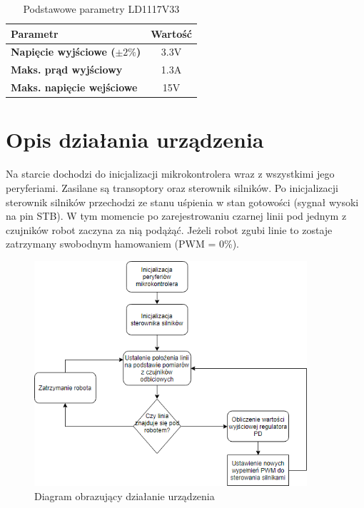 \documentclass[10pt, a4paper]{article}
\begin{document}
\begin{table}[H]
	\centering
	\begin{tabular}{|l|c|} \hline
		\textbf{Parametr} & Wartość \\
		\hline
		\hline  \textbf{Napięcie wyjściowe ($\pm 2\%$)}& 3.3V\\\hline
		\textbf{Maks. prąd wyjściowy} & 1.3A\\
		\hline
		\textbf{Maks. napięcie wejściowe} & 15V\\
		\hline
	\end{tabular}
	\caption{Podstawowe parametry LD1117V33}
	\label{tab:LD1117V33}
\end{table}
\newpage
\section{Opis działania urządzenia}
	Na starcie dochodzi do inicjalizacji mikrokontrolera wraz z wszystkimi jego peryferiami. Zasilane są transoptory oraz sterownik silników. Po inicjalizacji sterownik silników przechodzi ze stanu uśpienia w stan gotowości (sygnał wysoki na pin STB). W tym momencie po zarejestrowaniu czarnej linii pod jednym z czujników robot zaczyna za nią podążąć. Jeżeli robot zgubi linie to zostaje zatrzymany swobodnym hamowaniem (PWM = 0\%). 
\begin{figure}[H]
	\centering
	\includegraphics[width=0.9\textwidth]{flowchart.png}
	\caption{Diagram obrazujący działanie urządzenia}
	\label{fig:FlowChart}
\end{figure}
	
\end{document}
